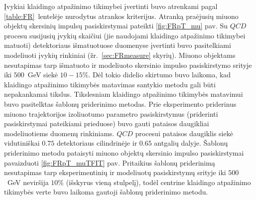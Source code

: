 \documentclass[a4paper, 12pt, oneside]{article}
\newcommand{\QCD}{QC\! D}
\begin{document}
Įvykiai klaidingo atpažinimo tikimybei įvertinti buvo atrenkami pagal \ref{table:FR}~lentelėje nurodytus atrankos kriterijus.
Atranką praėjusių miuono objektų skersinių impulsų pasiskirstymai pateikti \ref{fig:FRpT_mu} pav.
Su $\QCD$ procesu susijusių įvykių skaičiui (jie naudojami klaidingo atpažinimo tikimybei matuoti) detektoriaus išmatuotuose
duomenyse įvertinti buvo pasitelkiami modeliuoti įvykių rinkiniai (žr.\ \ref{sec:FRmeasure} skyrių).
Miuono objektams nesutapimas tarp išmatuoto ir modeliuoto skersinio impulso pasiskirstymo srityje iki $500$~GeV siekė $10-15\%$.
Dėl tokio didelio skirtumo buvo laikoma, kad klaidingo atpažinimo tikimybės matavimas santykio metodu gali būti nepakankamai tikslus.
Tikslesniam klaidingo atpažinimo tikimybės matavimui buvo pasitelktas šablonų priderinimo metodas.
Prie eksperimento priderinus miuono trajektorijos izoliuotumo parametro pasiskirstymus (priderinti pasiskirstymai pateikiami prieduose)
buvo gauti pataisos daugikliai modeliuotiems duomenų rinkiniams.
$\QCD$ procesui pataisos daugiklis siekė vidutiniškai $0.75$ detektoriaus cilindrinėje ir $0.65$ antgalių dalyje.
Šablonų priderinimo metodu pataisyti miuono objektų skersinio impulso pasiskirstymai pavaizduoti \ref{fig:FRpT_muTFIT} pav.
Pritaikius šablonų priderinimą nesutapimas tarp eksperimentinių ir modeliuotų pasiskirstymų srityje iki $500$~GeV neviršija $10\%$
(išskyrus vieną stulpelį), todėl centrine klaidingo atpažinimo tikimybės verte buvo laikoma gautoji šablonų priderinimo metodu.
\end{document}
